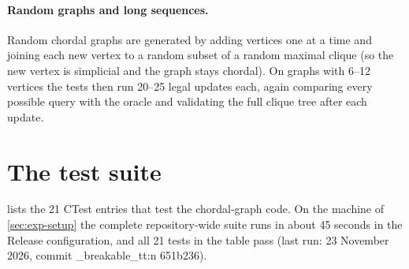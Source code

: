 \documentclass[11pt,a4paper,oneside]{report}
\theoremstyle{plain}
\theoremstyle{definition}
\theoremstyle{remark}
\DeclareRobustCommand{\code}[1]{\mtp_breakable_tt:n {#1}}
\begin{document}
\paragraph{Random graphs and long sequences.} Random chordal graphs are generated by adding
vertices one at a time and joining each new vertex to a random subset of a random maximal clique
(so the new vertex is simplicial and the graph stays chordal). On graphs with 6--12 vertices the
tests then run 20--25 legal updates each, again comparing every possible query with the oracle
and validating the full clique tree after each update.

\section{The test suite}
 lists the 21 CTest entries that test the chordal-graph code. On the machine of
\cref{sec:exp-setup} the complete repository-wide suite runs in about 45 seconds in the Release configuration,
and all 21 tests in the table pass (last run: 23 November 2026, commit \code{651b236}).
\end{document}
